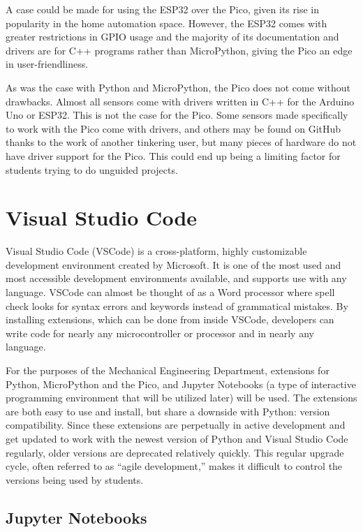 A case could be made for using the ESP32 over the Pico, given its rise in popularity in the home
automation space. However, the ESP32 comes with greater restrictions in GPIO usage and the majority
of its documentation and drivers are for C++ programs rather than MicroPython, giving the Pico an
edge in user-friendliness.

As was the case with Python and MicroPython, the Pico does not come without drawbacks. Almost all 
sensors come with drivers written in C++ for the Arduino Uno or ESP32. This is not the case for 
the Pico. Some sensors made specifically to work with the Pico come with drivers, and others may 
be found on GitHub thanks to the work of another tinkering user, but many pieces of hardware do 
not have driver support for the Pico. This could end up being a limiting factor for students trying 
to do unguided projects.

\section{Visual Studio Code}

Visual Studio Code (VSCode) is a cross-platform, highly customizable development environment created by
Microsoft. It is one of the most used and most accessible development environments available, 
and supports use with any language. VSCode can almost be thought of as a Word processor where 
spell check looks for syntax errors and keywords instead of grammatical mistakes. By installing
extensions, which can be done from inside VSCode, developers can write code for nearly any 
microcontroller or processor and in nearly any language.

For the purposes of the Mechanical Engineering Department, extensions for Python, MicroPython and
the Pico, and Jupyter Notebooks (a type of interactive programming environment that will be utilized
later) will be used. The extensions are both easy to use and install, but share a downside with
Python: version compatibility. Since these extensions are perpetually in active development and get updated
to work with the newest version of Python and Visual Studio Code regularly, older versions are deprecated 
relatively quickly. This regular upgrade cycle, often referred to as ``agile development,'' makes it 
difficult to control the versions being used by students.

\subsection{Jupyter Notebooks}

